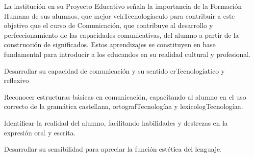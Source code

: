 \begin{syllabus}


\begin{justification}
La institución en su Proyecto Educativo señala la importancia de la Formación Humana de sus alumnos, que mejor vehTecnologíaculo para contribuir a este objetivo que el curso de Comunicación, que contribuye al desarrollo y perfeccionamiento de las capacidades comunicativas, del alumno a partir de la construcción de significados. Estos aprendizajes se constituyen en base fundamental para introducir a los educandos en su realidad cultural y profesional.
\end{justification}

\begin{goals}
\item Desarrollar su capacidad de comunicación y su sentido crTecnologíatico y reflexivo
\item Reconocer estructuras básicas en comunicación, capacitando al alumno en el uso correcto de la gramática castellana, ortografTecnologíaa y lexicologTecnologíaa.
\item Identificar la realidad del alumno, facilitando habilidades y destrezas en la expresión oral y escrita.
\item Desarrollar su sensibilidad para apreciar la función estética del lenguaje.
\end{goals}

\begin{outcomes}
\end{outcomes}


\end{syllabus}
